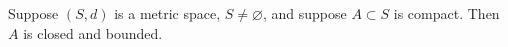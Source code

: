 Suppose $(S, d)$ is a metric space, $S \neq \varnothing$, and suppose $A \subset S$ is compact. Then $A$ is closed and bounded.
